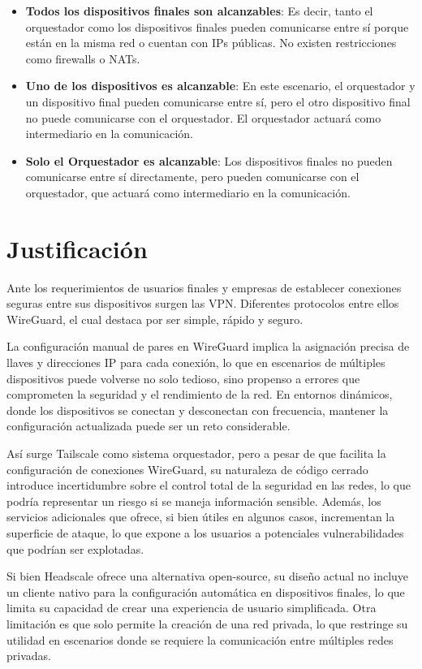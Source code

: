 \documentclass[letterpaper,12pt,oneside]{article}
\begin{document}
\begin{itemize}
    \item \textbf{Todos los dispositivos finales son alcanzables}: Es decir, tanto el orquestador como los dispositivos finales pueden comunicarse entre sí porque están en la misma red o cuentan con IPs públicas. No existen restricciones como firewalls o NATs.
    \item \textbf{Uno de los dispositivos es alcanzable}: En este escenario, el orquestador y un dispositivo final pueden comunicarse entre sí, pero el otro dispositivo final no puede comunicarse con el orquestador. El orquestador actuará como intermediario en la comunicación.
    \item \textbf{Solo el Orquestador es alcanzable}: Los dispositivos finales no pueden comunicarse entre sí directamente, pero pueden comunicarse con el orquestador, que actuará como intermediario en la comunicación.
\end{itemize}

\section{Justificación}

Ante los requerimientos de usuarios finales y empresas de establecer conexiones seguras entre sus dispositivos surgen las VPN. Diferentes protocolos entre ellos WireGuard, el cual destaca por ser simple, rápido y seguro.

La configuración manual de pares en WireGuard implica la asignación precisa de llaves y direcciones IP para cada conexión, lo que en escenarios de múltiples dispositivos puede volverse no solo tedioso, sino propenso a errores que comprometen la seguridad y el rendimiento de la red. En entornos dinámicos, donde los dispositivos se conectan y desconectan con frecuencia, mantener la configuración actualizada puede ser un reto considerable.

Así surge Tailscale como sistema orquestador, pero a pesar de que facilita la configuración de conexiones WireGuard, su naturaleza de código cerrado introduce incertidumbre sobre el control total de la seguridad en las redes, lo que podría representar un riesgo si se maneja información sensible. Además, los servicios adicionales que ofrece, si bien útiles en algunos casos, incrementan la superficie de ataque, lo que expone a los usuarios a potenciales vulnerabilidades que podrían ser explotadas.

Si bien Headscale ofrece una alternativa open-source, su diseño actual no incluye un cliente nativo para la configuración automática en dispositivos finales, lo que limita su capacidad de crear una experiencia de usuario simplificada. Otra limitación es que solo permite la creación de una red privada, lo que restringe su utilidad en escenarios donde se requiere la comunicación entre múltiples redes privadas.
\end{document}
